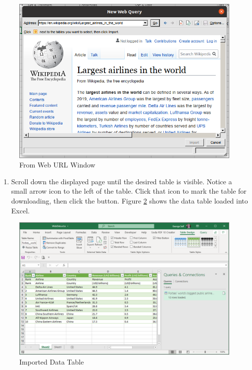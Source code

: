 \begin{figure}[H]
	\centering
	\includegraphics[width=\maxwidth{.95\linewidth}]{gfx/ch07_fig02}
	\caption{From Web URL Window}
	\label{07:fig02}
\end{figure}


\begin{enumerate}[resume]
	\item Scroll down the displayed page until the desired table is visible. Notice a small arrow icon to the left of the table. Click that icon to mark the table for downloading, then click the  button. Figure \ref{07:fig03} shows the data table loaded into Excel.
\end{enumerate}

\begin{figure}[H]
	\centering
	\includegraphics[width=\maxwidth{.95\linewidth}]{gfx/ch07_fig03}
	\caption{Imported Data Table}
	\label{07:fig03}
\end{figure}

